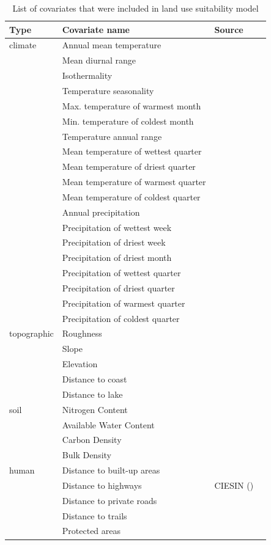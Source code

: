 \documentclass[titlesmallcaps,copyrightpage]{uomthesis}\usepackage[]{graphicx}\usepackage[]{color}
\begin{document}
\begin{table}[htb]
\setlength\tabcolsep{4pt} %
\caption{List of covariates that were included in land use suitability model}  
\label{ch3:tab3}
\footnotesize 
\begin{tabularx}{0.8\textwidth}{@{} llll@{}}
\toprule 
Type & Covariate name & Source \\
\toprule
climate & Annual mean temperature & \cite{fick_worldclim_2017} \\
& Mean diurnal range & \\
& Isothermality & \\
& Temperature seasonality & \\
& Max. temperature of warmest month & \\
& Min. temperature of coldest month & \\
& Temperature annual range & \\
& Mean temperature of wettest quarter & \\
& Mean temperature of driest quarter & \\
& Mean temperature of warmest quarter & \\
& Mean temperature of coldest quarter & \\
& Annual precipitation & \\
& Precipitation of wettest week & \\
& Precipitation of driest week & \\
& Precipitation of driest month & \\
& Precipitation of wettest quarter & \\
& Precipitation of driest quarter & \\
& Precipitation of warmest quarter & \\
& Precipitation of coldest quarter & \\
topographic & Roughness & \cite{hijmans_very_2005} \\
& Slope & \\
& Elevation & \\
& Distance to coast & \cite{wessel_global_1996}\\
& Distance to lake & \\
soil & Nitrogen Content & \cite{global_soil_data_task_group_global_2000}\\
& Available Water Content & \\
& Carbon Density & \\
& Bulk Density & \\
human & Distance to built-up areas & \cite{fao_built-up_1997}\\
& Distance to highways & CIESIN (\citeyear{center_for_international_earth_science_information_network_-_ciesin_-_columbia_global_2013})\\
& Distance to private roads & \\
& Distance to trails & \\
& Protected areas & \cite{iucn_world_2014} \\
\bottomrule
\end{tabularx}
\end{table}
\end{document}
